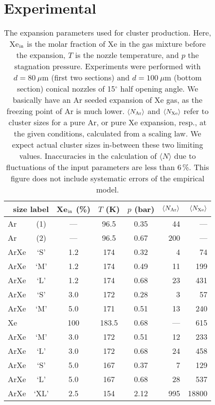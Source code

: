 \section{Experimental}
%
\begin{table*}
\caption{
The expansion parameters used for cluster production. 
Here, Xe$_{\rm in}$ is the molar fraction of Xe in the gas mixture before the expansion, $T$ is the nozzle temperature, and $p$ the stagnation pressure. 
Experiments were performed with $d = 80~\mu$m (first two sections) and $d = 100~\mu$m (bottom section) conical nozzles of 15$^\circ$ half opening angle. 
We basically have an Ar seeded expansion of Xe gas, as the freezing point of Ar is much lower. 
$\langle N_{\rm Ar} \rangle$ and $\langle N_{\rm Xe} \rangle$ refer to cluster sizes for a pure Ar, or pure Xe expansion, resp., at the given conditions, calculated from a scaling law.\protect\cite{hagena1981}
We expect actual cluster sizes in-between these two limiting values. 
Inaccuracies in the calculation of $\langle N\rangle$ due to fluctuations of the input parameters are less than 6\,\%. This figure does not include systematic errors of the empirical model.
}
\label{tab:cluster}

\begin{tabular}{l c c c c r r}
%
\toprule
  \multicolumn{2}{r}{size label}  &  Xe$_{\rm in}$ (\%)  &  $T$ (K)  &  $p$ (bar) & $\langle N_{\rm Ar} \rangle$ & $\langle N_{\rm Xe} \rangle$ \\
%
\midrule
Ar & (1) & --- &  96.5  & 0.35  & 44  &  --- \\
Ar & (2) & --- &  96.5  & 0.67  & 200  &  --- \\
ArXe & `S' & 1.2 &  174   & 0.32  & 4  &   74 \\
ArXe & `M' & 1.2 &  174   & 0.49  & 11  &  199 \\
ArXe & `L' & 1.2 &  174   & 0.68  & 23  &  431 \\
ArXe & `S' & 3.0 &  172   & 0.28  & 3  &   57 \\
ArXe & `M' & 5.0 &  171   & 0.51  & 13  &  240 \\
Xe &  & 100 & 183.5  & 0.68  & ---  &  615 \\     
\midrule
ArXe & `M' & 3.0 &  172   & 0.51  & 12  &  233 \\
ArXe & `L' & 3.0 &  172   & 0.68  & 24  &  458 \\
ArXe & `S'  & 5.0 &  167  & 0.37  & 7  &  129 \\
ArXe & `L'  & 5.0 &  167  & 0.68  & 28  &  537 \\
\midrule
ArXe & `XL' & 2.5 &  154  & 2.12  & 995 & 18800\\
%
\bottomrule
\end{tabular}
\end{table*}
